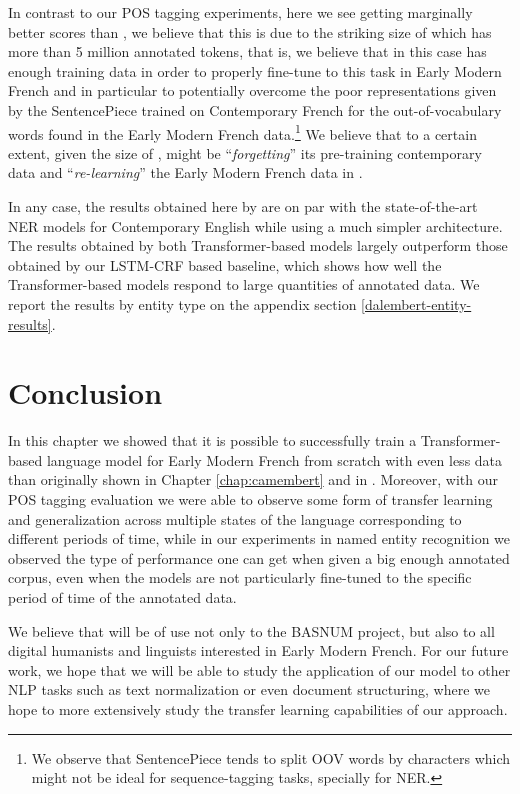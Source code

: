 In contrast to our POS tagging experiments, here we see \dalembert getting marginally better scores than \dalembert, we believe that this is due to the striking size of \freemner which has more than 5 million annotated tokens, that is, we believe that in this case \camembert has enough training data in order to properly fine-tune to this task in Early Modern French and in particular to potentially overcome the poor representations given by the SentencePiece \citep{kudo-richardson-2018-sentencepiece} trained on Contemporary French for the out-of-vocabulary words found in the Early Modern French data.\footnote{We observe that SentencePiece tends to split OOV words by characters which might not be ideal for sequence-tagging tasks, specially for NER.} We believe that to a certain extent, given the size of \freemner, \camembert might be \enquote{\emph{forgetting}} its pre-training contemporary data and \enquote{\emph{re-learning}} the Early Modern French data in \freemner.

In any case, the results obtained here by \dalembert are on par with the state-of-the-art NER models for Contemporary English \citep{wang-etal-2021-automated} while using a much simpler architecture. The results obtained by both Transformer-based models largely outperform those obtained by our LSTM-CRF based baseline, which shows how well the Transformer-based models respond to large quantities of annotated data. We report the results by entity type on the appendix section \ref{dalembert-entity-results}.

\section{Conclusion}

In this chapter we showed that it is possible to successfully train a Transformer-based language model for Early Modern French from scratch with even less data than originally shown in Chapter \ref{chap:camembert} and in \citep{martin-etal-2020-camembert}. Moreover, with our POS tagging evaluation we were able to observe some form of transfer learning and generalization across multiple states of the language corresponding to different periods of time, while in our experiments in named entity recognition we observed the type of performance one can get when given a big enough annotated corpus, even when the models are not particularly fine-tuned to the specific period of time of the annotated data.

We believe that \dalembert will be of use not only to the BASNUM project, but also to all digital humanists and linguists interested in Early Modern French. For our future work, we hope that we will be able to study the application of our \dalembert model to other NLP tasks such as text normalization or even document structuring, where we hope to more extensively study the transfer learning capabilities of our approach.
